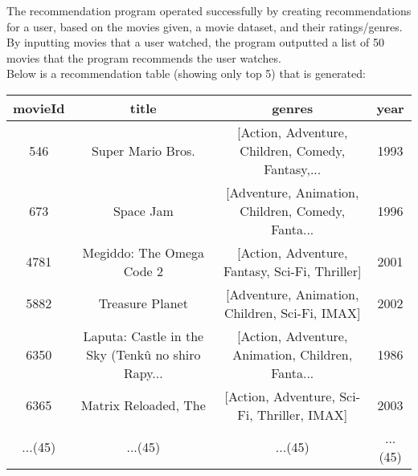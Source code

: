 \documentclass{article}
\begin{document}
The recommendation program operated successfully by creating recommendations for a user, based on the movies 
given, a movie dataset, and their ratings/genres. By inputting movies that a user watched, the program outputted
a list of 50 movies that the program recommends the user watches.\\
Below is a recommendation table (showing only top 5) that is generated: 
\begin{center}
    \begin{adjustwidth}{-3.5cm}{}
    \begin{tabular}{||c c c c||}
        \hline
        movieId & title & genres & year \\ [0.5ex] 
        \hline\hline
        546 & Super Mario Bros. & [Action, Adventure, Children, Comedy, Fantasy,... & 1993 \\ 
        \hline
        673 & Space Jam & [Adventure, Animation, Children, Comedy, Fanta... & 1996 \\ 
        \hline
        4781 & Megiddo: The Omega Code 2 & [Action, Adventure, Fantasy, Sci-Fi, Thriller] & 2001 \\ 
        \hline
        5882 & Treasure Planet & [Adventure, Animation, Children, Sci-Fi, IMAX] & 2002 \\ 
        \hline
        6350 & Laputa: Castle in the Sky (Tenkû no shiro Rapy... & [Action, Adventure, Animation, Children, Fanta... & 1986 \\ 
        \hline
        6365 & Matrix Reloaded, The & [Action, Adventure, Sci-Fi, Thriller, IMAX] & 2003 \\  
        \hline
        ...(45) & ...(45) & ...(45) & ...(45) \\ [1ex]
        \hline
    \end{tabular}
    \end{adjustwidth}
    \end{center}
\end{document}
